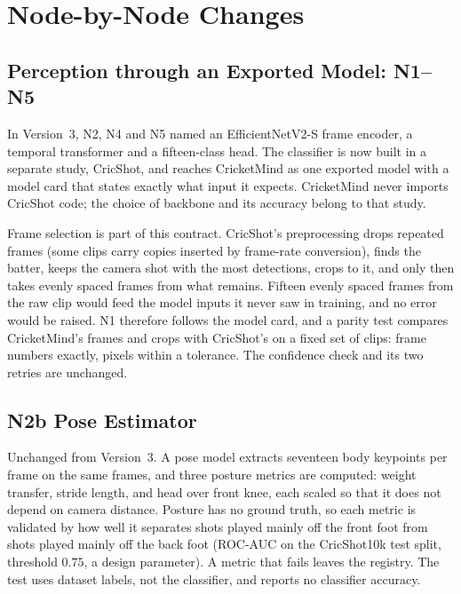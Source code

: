 \documentclass[11pt,a4paper]{article}
\begin{document}
\section{Node-by-Node Changes}

\subsection{Perception through an Exported Model: N1--N5}

In Version~3, N2, N4 and N5 named an EfficientNetV2-S frame encoder, a temporal
transformer and a fifteen-class head. The classifier is now built in a separate
study, CricShot, and reaches CricketMind as one exported model with a model card
that states exactly what input it expects. CricketMind never imports CricShot
code; the choice of backbone and its accuracy belong to that study.

Frame selection is part of this contract. CricShot's preprocessing drops repeated
frames (some clips carry copies inserted by frame-rate conversion), finds the
batter, keeps the camera shot with the most detections, crops to it, and only
then takes evenly spaced frames from what remains. Fifteen evenly spaced frames
from the raw clip would feed the model inputs it never saw in training, and no
error would be raised. N1 therefore follows the model card, and a parity test
compares CricketMind's frames and crops with CricShot's on a fixed set of clips:
frame numbers exactly, pixels within a tolerance. The confidence check and its
two retries are unchanged.

\subsection{N2b Pose Estimator}

Unchanged from Version~3. A pose model \cite{yolo} extracts seventeen body
keypoints per frame on the same frames, and three posture metrics are computed:
weight transfer, stride length, and head over front knee, each scaled so that it
does not depend on camera distance. Posture has no ground truth, so each metric
is validated by how well it separates shots played mainly off the front foot from
shots played mainly off the back foot (ROC-AUC on the CricShot10k test split,
threshold $0.75$, a design parameter). A metric that fails leaves the registry.
The test uses dataset labels, not the classifier, and reports no classifier
accuracy.
\end{document}
